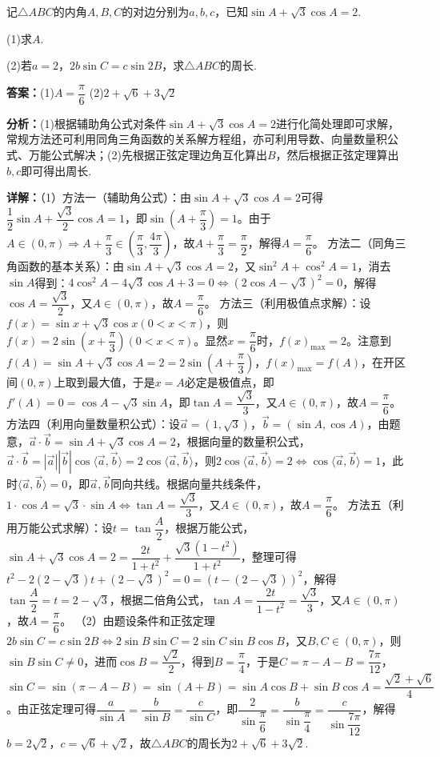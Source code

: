 \begin{question}[points=15]
记$\triangle ABC$的内角$A,B,C$的对边分别为$a,b,c$，已知$\sin A+\sqrt{3}\cos A=2$.

(1)求$A$.

(2)若$a=2$，$2b\sin C=c\sin 2B$，求$\triangle ABC$的周长.
\begin{solution}
\textbf{答案：}(1)$A=\dfrac{\pi}{6}$
(2)$2+\sqrt{6}+3\sqrt{2}$

\textbf{分析：}(1)根据辅助角公式对条件$\sin A+\sqrt{3}\cos A=2$进行化简处理即可求解，常规方法还可利用同角三角函数的关系解方程组，亦可利用导数、向量数量积公式、万能公式解决；(2)先根据正弦定理边角互化算出$B$，然后根据正弦定理算出$b,c$即可得出周长.

\textbf{详解：}（1）方法一（辅助角公式）：由$\sin A+\sqrt{3}\cos A=2$可得$\dfrac{1}{2}\sin A+\dfrac{\sqrt{3}}{2}\cos A=1$，即$\sin\left(A+\dfrac{\pi}{3}\right)=1$。由于$A\in(0,\pi)\Rightarrow A+\dfrac{\pi}{3}\in\left(\dfrac{\pi}{3},\dfrac{4\pi}{3}\right)$，故$A+\dfrac{\pi}{3}=\dfrac{\pi}{2}$，解得$A=\dfrac{\pi}{6}$。
方法二（同角三角函数的基本关系）：由$\sin A+\sqrt{3}\cos A=2$，又$\sin^2 A+\cos^2 A=1$，消去$\sin A$得到：$4\cos^2 A-4\sqrt{3}\cos A+3=0\Leftrightarrow(2\cos A-\sqrt{3})^2=0$，解得$\cos A=\dfrac{\sqrt{3}}{2}$，又$A\in(0,\pi)$，故$A=\dfrac{\pi}{6}$。
方法三（利用极值点求解）：设$f(x)=\sin x+\sqrt{3}\cos x(0<x<\pi)$，则$f(x)=2\sin\left(x+\dfrac{\pi}{3}\right)(0<x<\pi)$。显然$x=\dfrac{\pi}{6}$时，$f(x)_{\max}=2$。注意到$f(A)=\sin A+\sqrt{3}\cos A=2=2\sin\left(A+\dfrac{\pi}{3}\right)$，$f(x)_{\max}=f(A)$，在开区间$(0,\pi)$上取到最大值，于是$x=A$必定是极值点，即$f'(A)=0=\cos A-\sqrt{3}\sin A$，即$\tan A=\dfrac{\sqrt{3}}{3}$，又$A\in(0,\pi)$，故$A=\dfrac{\pi}{6}$。
方法四（利用向量数量积公式）：设$\vec{a}=(1,\sqrt{3})$，$\vec{b}=(\sin A,\cos A)$，由题意，$\vec{a}\cdot\vec{b}=\sin A+\sqrt{3}\cos A=2$，根据向量的数量积公式，$\vec{a}\cdot\vec{b}=|\vec{a}||\vec{b}|\cos\langle\vec{a},\vec{b}\rangle=2\cos\langle\vec{a},\vec{b}\rangle$，则$2\cos\langle\vec{a},\vec{b}\rangle=2\Leftrightarrow\cos\langle\vec{a},\vec{b}\rangle=1$，此时$\langle\vec{a},\vec{b}\rangle=0$，即$\vec{a},\vec{b}$同向共线。根据向量共线条件，$1\cdot\cos A=\sqrt{3}\cdot\sin A\Leftrightarrow\tan A=\dfrac{\sqrt{3}}{3}$，又$A\in(0,\pi)$，故$A=\dfrac{\pi}{6}$。
方法五（利用万能公式求解）：设$t=\tan\dfrac{A}{2}$，根据万能公式，$\sin A+\sqrt{3}\cos A=2=\dfrac{2t}{1+t^2}+\dfrac{\sqrt{3}(1-t^2)}{1+t^2}$，整理可得$t^2-2(2-\sqrt{3})t+(2-\sqrt{3})^2=0=(t-(2-\sqrt{3}))^2$，解得$\tan\dfrac{A}{2}=t=2-\sqrt{3}$，根据二倍角公式，$\tan A=\dfrac{2t}{1-t^2}=\dfrac{\sqrt{3}}{3}$，又$A\in(0,\pi)$，故$A=\dfrac{\pi}{6}$。
（2）由题设条件和正弦定理$2b\sin C=c\sin2B\Leftrightarrow2\sin B\sin C=2\sin C\sin B\cos B$，又$B,C\in(0,\pi)$，则$\sin B\sin C\neq0$，进而$\cos B=\dfrac{\sqrt{2}}{2}$，得到$B=\dfrac{\pi}{4}$，于是$C=\pi-A-B=\dfrac{7\pi}{12}$，$\sin C=\sin(\pi-A-B)=\sin(A+B)=\sin A\cos B+\sin B\cos A=\dfrac{\sqrt{2}+\sqrt{6}}{4}$。由正弦定理可得$\dfrac{a}{\sin A}=\dfrac{b}{\sin B}=\dfrac{c}{\sin C}$，即$\dfrac{2}{\sin\dfrac{\pi}{6}}=\dfrac{b}{\sin\dfrac{\pi}{4}}=\dfrac{c}{\sin\dfrac{7\pi}{12}}$，解得$b=2\sqrt{2}$，$c=\sqrt{6}+\sqrt{2}$，故$\triangle ABC$的周长为$2+\sqrt{6}+3\sqrt{2}$.
\end{solution}
\end{question}

